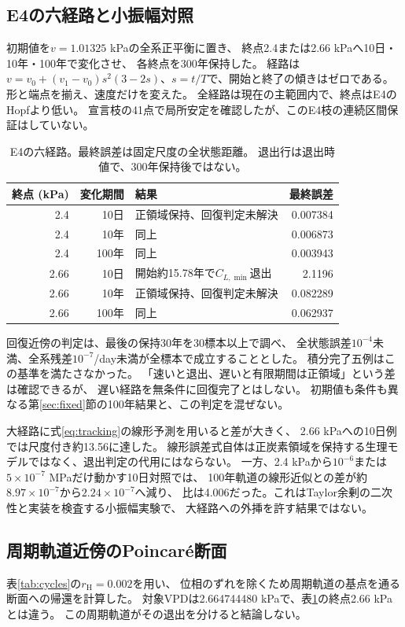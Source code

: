 \documentclass[a4paper,11pt]{ltjsarticle}
\begin{document}
\subsection{E4の六経路と小振幅対照}
初期値を$v=1.01325$ kPaの全系正平衡に置き、
終点2.4または2.66 kPaへ10日・10年・100年で変化させ、
各終点を300年保持した。
経路は$v=v_0+(v_1-v_0)s^2(3-2s)$、$s=t/T$で、開始と終了の傾きはゼロである。
形と端点を揃え、速度だけを変えた。
全経路は現在の主範囲内で、終点はE4のHopfより低い。
宣言枝の41点で局所安定を確認したが、このE4枝の連続区間保証はしていない。

\begin{table}[tb]
\centering
\caption{E4の六経路。最終誤差は固定尺度の全状態距離。
退出行は退出時値で、300年保持後ではない。}\label{tab:ramps}
\begin{tabular}{rrlr}
\toprule
終点 (kPa)&変化期間&結果&最終誤差\\\midrule
2.4&10日&正領域保持、回復判定未解決&0.007384\\
2.4&10年&同上&0.006873\\
2.4&100年&同上&0.003943\\
2.66&10日&開始約15.78年で$C_{L,\min}$退出&2.1196\\
2.66&10年&正領域保持、回復判定未解決&0.082289\\
2.66&100年&同上&0.062937\\
\bottomrule
\end{tabular}
\end{table}

回復近傍の判定は、最後の保持30年を30標本以上で調べ、
全状態誤差$10^{-4}$未満、全系残差$10^{-7}$/day未満が全標本で成立することとした。
積分完了五例はこの基準を満たさなかった。
「速いと退出、遅いと有限期間は正領域」という差は確認できるが、
遅い経路を無条件に回復完了とはしない。
初期値も条件も異なる第\ref{sec:fixed}節の100年結果と、この判定を混ぜない。

大経路に式\eqref{eq:tracking}の線形予測を用いると差が大きく、
2.66 kPaへの10日例では尺度付き約13.56に達した。
線形誤差式自体は正炭素領域を保持する生理モデルではなく、退出判定の代用にはならない。
一方、2.4 kPaから$10^{-6}$または$5\times10^{-7}$ MPaだけ動かす10日対照では、
100年軌道の線形近似との差が約$8.97\times10^{-7}$から$2.24\times10^{-7}$へ減り、
比は4.006だった。これはTaylor余剰の二次性と実装を検査する小振幅実験で、
大経路への外挿を許す結果ではない。

\subsection{周期軌道近傍のPoincaré断面}
表\ref{tab:cycles}の$r_{\mathrm H}=0.002$を用い、
位相のずれを除くため周期軌道の基点を通る断面への帰還を計算した。
対象VPDは2.664744480 kPaで、表\ref{tab:ramps}の終点2.66 kPaとは違う。
この周期軌道がその退出を分けると結論しない。
\end{document}
